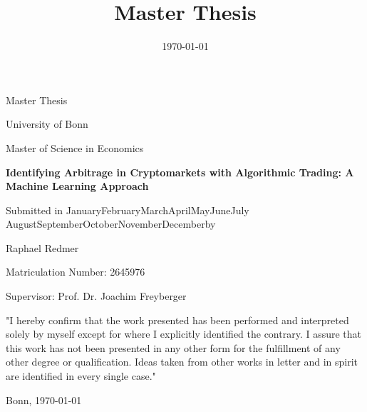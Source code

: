 \documentclass[12pt,a4paper]{scrartcl}
\title{Master Thesis}
\date{\today}
\newcommand*{\printdate}{%
   \ifcase \month\or January\or February\or March\or April\or May\or June\or July\or
    August\or September\or October\or November\or December\fi \space \number\year}
\begin{document}
	\begin{titlepage}
		\centering
		Master Thesis

		University of Bonn
		
		Master of Science in Economics
		\vspace{1in}
		\vspace{1in}
		\begin{flushleft}
			{\LARGE \bfseries  
				Identifying Arbitrage in Cryptomarkets with Algorithmic Trading: \newline
				\newline
				A Machine Learning Approach}
			\vspace{1in}
		\end{flushleft}
		{\large Submitted in \printdate \space by}
		
		{
			\LARGE Raphael Redmer \par
			\large Matriculation Number: 2645976 \par
		}
		
		\vspace{1in}
		
			Supervisor: Prof. Dr. Joachim Freyberger
			
		\vfill
		
		
	\end{titlepage}
	
	
	
	\newpage	
	\tableofcontents
	\thispagestyle{empty}
	\newpage


	

	

	

	

	

	

	\pagebreak

	\printbibliography

	
	\pagebreak

	


	\thispagestyle{empty}
	"I hereby confirm that the work presented has been performed and interpreted solely by myself except for where I explicitly identified the contrary. 
	I assure that this work has not been presented in any other form for the fulfillment of any other degree or qualification. 
	Ideas taken from other works in letter and in spirit are identified in every single case."
	\vspace{0.3in}

	\noindent Bonn, \today
\end{document}
